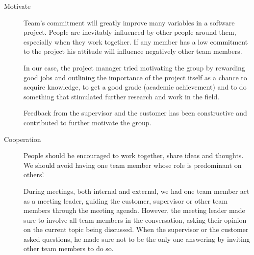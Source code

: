 \begin{description}

\item[Motivate]
Team's commitment will greatly improve many variables in a software project.
People are inevitably influenced by other people around them, especially when they work together.
If any member has a low commitment to the project his attitude will influence negatively other team members.




In our case, the project manager tried motivating the group by rewarding good jobs
and outlining the importance of the project itself as a chance to acquire knowledge,
to get a good grade (academic achievement) and to do something that stimulated further
research and work in the field.

Feedback from the supervisor and the customer has been constructive and
contributed to further motivate the group.

\item[Cooperation]
People should be encouraged to work together, share ideas and thoughts.
We should avoid having one team member whose role is predominant on others'.

During meetings, both internal and external, we had one team member
act as a meeting leader, guiding the customer, supervisor or other team members through
the meeting agenda. However, the meeting leader made sure to involve all team members
in the conversation, asking their opinion on the current topic being discussed.
When the supervisor or the customer asked questions, he made sure not to be the only one
answering by inviting other team members to do so.


\end{description}
